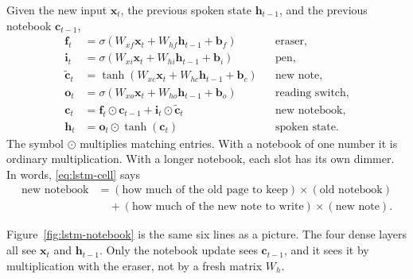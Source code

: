 \documentclass[11pt]{article}
\begin{document}
Given the new input \(\mathbf{x}_t\), the previous spoken state
\(\mathbf{h}_{t-1}\), and the previous notebook \(\mathbf{c}_{t-1}\),
\begin{align}
\mathbf{f}_t
&=
\sigma(W_{xf}\mathbf{x}_t+W_{hf}\mathbf{h}_{t-1}+\mathbf{b}_f)
&&\text{eraser},
\label{eq:lstm-f}\\
\mathbf{i}_t
&=
\sigma(W_{xi}\mathbf{x}_t+W_{hi}\mathbf{h}_{t-1}+\mathbf{b}_i)
&&\text{pen},
\label{eq:lstm-i}\\
\tilde{\mathbf{c}}_t
&=
\tanh(W_{xc}\mathbf{x}_t+W_{hc}\mathbf{h}_{t-1}+\mathbf{b}_c)
&&\text{new note},
\label{eq:lstm-c}\\
\mathbf{o}_t
&=
\sigma(W_{xo}\mathbf{x}_t+W_{ho}\mathbf{h}_{t-1}+\mathbf{b}_o)
&&\text{reading switch},
\label{eq:lstm-o}\\
\mathbf{c}_t
&=
\mathbf{f}_t\odot\mathbf{c}_{t-1}
+
\mathbf{i}_t\odot\tilde{\mathbf{c}}_t
&&\text{new notebook},
\label{eq:lstm-cell}\\
\mathbf{h}_t
&=
\mathbf{o}_t\odot\tanh(\mathbf{c}_t)
&&\text{spoken state}.
\label{eq:lstm-h}
\end{align}
The symbol \(\odot\) multiplies matching entries. With a notebook of one
number it is ordinary multiplication. With a longer notebook, each slot has
its own dimmer. In words, \eqref{eq:lstm-cell} says
\begin{align*}
\text{new notebook}
&=
(\text{how much of the old page to keep})
\times
(\text{old notebook}) \\
&\quad+
(\text{how much of the new note to write})
\times
(\text{new note}).
\end{align*}

Figure~\ref{fig:lstm-notebook} is the same six lines as a picture. The four
dense layers all see \(\mathbf{x}_t\) and \(\mathbf{h}_{t-1}\). Only the
notebook update sees \(\mathbf{c}_{t-1}\), and it sees it by multiplication
with the eraser, not by a fresh matrix \(W_h\).
\end{document}
